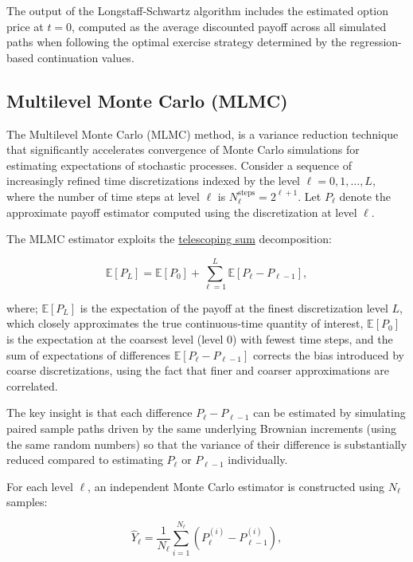 \documentclass[titlepage]{article}
\begin{document}
The output of the Longstaff-Schwartz algorithm includes the estimated option price at \(t=0\), computed as the average discounted payoff across all simulated paths when following the optimal exercise strategy determined by the regression-based continuation values.

\subsection{Multilevel Monte Carlo (MLMC)}

The Multilevel Monte Carlo (MLMC) method, is a variance reduction technique that significantly accelerates convergence of Monte Carlo simulations for estimating expectations of stochastic processes. Consider a sequence of increasingly refined time discretizations indexed by the level \(\ell = 0, 1, \ldots, L\), where the number of time steps at level \(\ell\) is \(N_\ell^{\text{steps}} = 2^{\ell+1}\). Let \(P_\ell\) denote the approximate payoff estimator computed using the discretization at level \(\ell\).

The MLMC estimator exploits the \href{sec:telescoping}{telescoping sum} decomposition:

\begin{equation}
\mathbb{E}[P_L] = \mathbb{E}[P_0] + \sum_{\ell=1}^L \mathbb{E}[P_\ell - P_{\ell-1}],
\label{eq:mlmc_telescoping}
\end{equation}

where; \(\mathbb{E}[P_L]\) is the expectation of the payoff at the finest discretization level \(L\), which closely approximates the true continuous-time quantity of interest, \(\mathbb{E}[P_0]\) is the expectation at the coarsest level (level 0) with fewest time steps, and the sum of expectations of differences \(\mathbb{E}[P_\ell - P_{\ell-1}]\) corrects the bias introduced by coarse discretizations, using the fact that finer and coarser approximations are correlated.

The key insight is that each difference \(P_\ell - P_{\ell-1}\) can be estimated by simulating paired sample paths driven by the same underlying Brownian increments (using the same random numbers) so that the variance of their difference is substantially reduced compared to estimating \(P_\ell\) or \(P_{\ell-1}\) individually.

For each level \(\ell\), an independent Monte Carlo estimator is constructed using \(N_\ell\) samples:

\begin{equation}
\hat{Y}_\ell = \frac{1}{N_\ell} \sum_{i=1}^{N_\ell} \left(P_\ell^{(i)} - P_{\ell-1}^{(i)}\right),
\label{eq:mlmc_estimator_level}
\end{equation}
\end{document}
